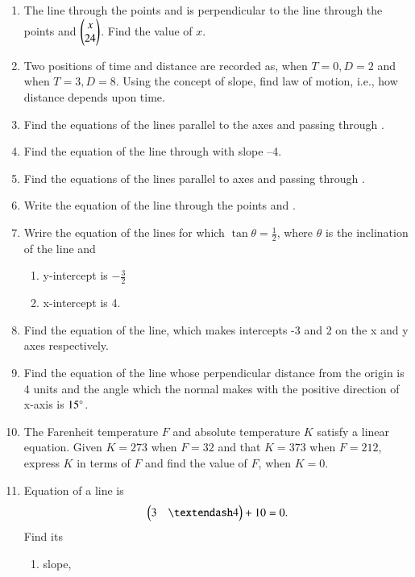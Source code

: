 \begin{enumerate}[label=\arabic*.,ref=\thesubsection.\theenumi]
\item The line through the points  and  is perpendicular to the line through the points  and $\begin{pmatrix}x\\24\end{pmatrix}$.  Find the value of $x$.
\item Two positions of time and distance are recorded as, when $T = 0, D = 2$ and when $T = 3, D = 8$. Using the concept of slope, find law of motion, i.e., how distance depends upon time.
\item Find the equations of the lines parallel to the axes and passing through .
\item Find the equation of the line through  with slope –4.
\item Find the equations of the lines parallel to axes and passing through .
\item Write the equation of the line through the points  and .
\item Wrire the equation of the lines for which $\tan \theta = \frac{1}{2}$, where $\theta$ is the inclination of the line and 
\begin{enumerate}
\item y-intercept is $-\frac{3}{2}$
\item x-intercept is 4.
\end{enumerate}
\item Find the equation of the line, which makes intercepts -3 and 2 on the x and y axes respectively.
\item Find the equation of the line whose perpendicular distance from the origin is 4 units and the angle which the normal makes with the positive direction of x-axis is $15\degree$.
\item The Farenheit temperature $F$ and absolute temperature $K$ satisfy a linear equation.  Given $K=273$ when $F=32$ and that $K=373$  when $F=212$, express $K$ in terms of $F$ and find the value of $F$, when $K=0$.
\item Equation of a line is 
\begin{align}
\myvec{3 & – 4} + 10 = 0. 
\end{align}
Find its 
\begin{enumerate}
\item  slope, 

\end{enumerate}
\end{enumerate}
